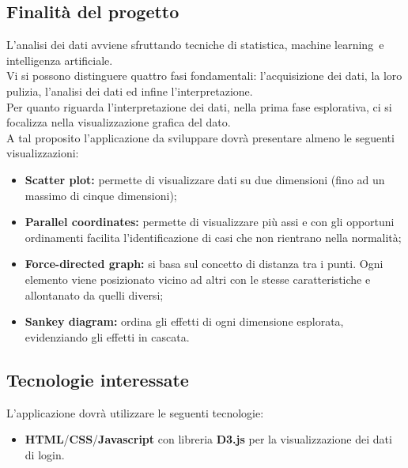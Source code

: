 \subsection{Finalità del progetto}
    L’analisi dei dati avviene sfruttando tecniche di statistica, machine learning\glo\ e intelligenza artificiale\glo.\\
    Vi si possono distinguere quattro fasi fondamentali: l'acquisizione dei dati, la loro pulizia, l'analisi dei dati ed infine l'interpretazione.\\
    Per quanto riguarda l'interpretazione dei dati, nella prima fase esplorativa, ci si focalizza nella visualizzazione grafica del dato.\\
    A tal proposito l'applicazione da sviluppare dovrà presentare almeno le seguenti visualizzazioni:
    \begin {itemize}
        \item \textbf{Scatter plot:} permette di visualizzare dati su due dimensioni (fino ad un massimo di cinque dimensioni);
        \item \textbf{Parallel coordinates:} permette di visualizzare più assi e con gli opportuni ordinamenti facilita l’identificazione di casi che non rientrano nella normalità;
        \item \textbf{Force-directed graph:} si basa sul concetto di distanza tra i punti. Ogni elemento viene posizionato vicino ad altri con le stesse caratteristiche e allontanato da quelli diversi;
        \item \textbf{Sankey diagram:} ordina gli effetti di ogni dimensione esplorata, evidenziando gli effetti in cascata.
    \end {itemize}

\subsection {Tecnologie interessate}
    L'applicazione dovrà utilizzare le seguenti tecnologie:
    \begin {itemize}
        \item \textbf{HTML\glo}/\textbf{CSS\glo}/\textbf{Javascript\glo} con libreria \textbf{D3.js\glo} per la visualizzazione dei dati di login.
    \end {itemize}

